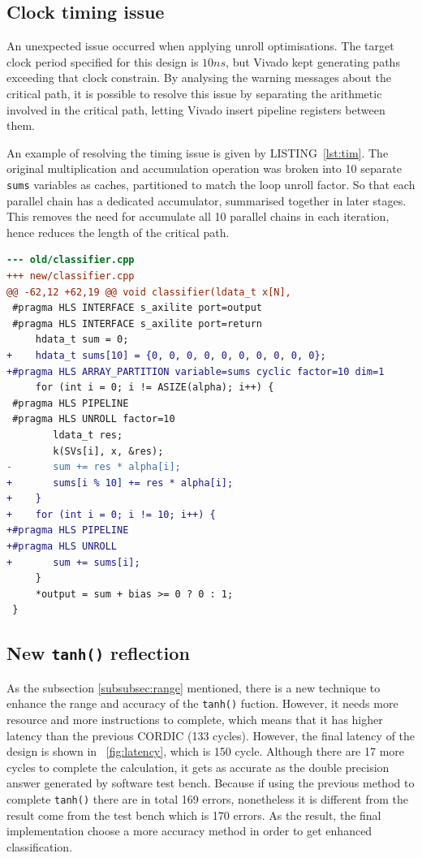 \documentclass[journal]{IEEEtran}
\newcommand{\fref}[1]{\figurename~\ref{#1}}
\newcommand{\lref}[1]{LISTING~\ref{#1}}
\begin{document}
\subsection{Clock timing issue}

An unexpected issue occurred when applying unroll optimisations. The target clock period specified for this design is $10 ns$, but Vivado kept generating paths exceeding that clock constrain. By analysing the warning messages about the critical path, it is possible to resolve this issue by separating the arithmetic involved in the critical path, letting Vivado insert pipeline registers between them.

An example of resolving the timing issue is given by \lref{lst:tim}. The original multiplication and accumulation operation was broken into 10 separate \texttt{sums} variables as caches, partitioned to match the loop unroll factor. So that each parallel chain has a dedicated accumulator, summarised together in later stages. This removes the need for accumulate all 10 parallel chains in each iteration, hence reduces the length of the critical path.

\begin{lstlisting}[language=diff,caption={Code modification to resolve timing issue},captionpos=b,label=lst:tim]
--- old/classifier.cpp
+++ new/classifier.cpp
@@ -62,12 +62,19 @@ void classifier(ldata_t x[N],
 #pragma HLS INTERFACE s_axilite port=output
 #pragma HLS INTERFACE s_axilite port=return
     hdata_t sum = 0;
+    hdata_t sums[10] = {0, 0, 0, 0, 0, 0, 0, 0, 0, 0};
+#pragma HLS ARRAY_PARTITION variable=sums cyclic factor=10 dim=1
     for (int i = 0; i != ASIZE(alpha); i++) {
 #pragma HLS PIPELINE
 #pragma HLS UNROLL factor=10
        ldata_t res;
        k(SVs[i], x, &res);
-       sum += res * alpha[i];
+       sums[i % 10] += res * alpha[i];
+    }
+    for (int i = 0; i != 10; i++) {
+#pragma HLS PIPELINE
+#pragma HLS UNROLL
+       sum += sums[i];
     }
     *output = sum + bias >= 0 ? 0 : 1;
 }
\end{lstlisting}

\subsection{New \texttt{tanh()} reflection}
As the subsection \ref{subsubsec:range} mentioned, there is a new technique to enhance the range and accuracy of the \texttt{tanh()} fuction. However, it needs more resource and more instructions to complete, which means that it has higher latency than the previous CORDIC (133 cycles). However, the final latency of the design is shown in \fref{fig:latency}, which is 150 cycle. Although there are 17 more cycles to complete the calculation, it gets as accurate as the double precision answer generated by software test bench. Because if using the previous method to complete \texttt{tanh()} there are in total 169 errors, nonetheless it is different from the result come from the test bench which is 170 errors. As the result, the final implementation choose a more accuracy method in order to get enhanced classification.
\end{document}
